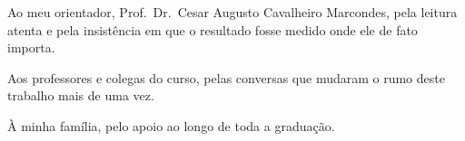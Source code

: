 Ao meu orientador, Prof.~Dr.~Cesar Augusto Cavalheiro Marcondes, pela leitura atenta e pela insistência em que o resultado
fosse medido onde ele de fato importa.

Aos professores e colegas do curso, pelas conversas que mudaram o rumo deste
trabalho mais de uma vez.

À minha família, pelo apoio ao longo de toda a graduação.
